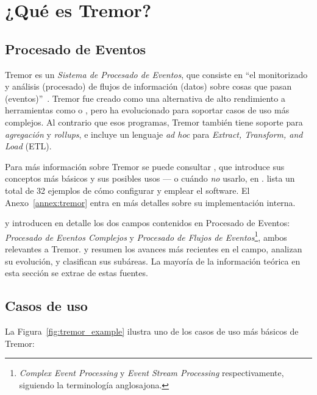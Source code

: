 
\chapter{¿Qué es Tremor?}\label{ch:tremor}

\section{Procesado de Eventos}

Tremor es un \emph{Sistema de Procesado de Eventos}, que consiste en ``el
monitorizado y análisis (procesado) de flujos de información (datos) sobre cosas
que pasan (eventos)''~\cite{luckham2011event}. Tremor fue creado como una
alternativa de alto rendimiento a herramientas como \textcite{logstash} o
\textcite{telegraf}, pero ha evolucionado para soportar casos de uso más
complejos. Al contrario que esos programas, Tremor también tiene soporte para
\emph{agregación} y \emph{rollups}, e incluye un lenguaje \emph{ad hoc} para
\emph{Extract, Transform, and Load} (ETL).

Para más información sobre Tremor se puede consultar \textcite{tremorintro}, que
introduce sus conceptos más básicos y sus posibles usos --- o cuándo \emph{no}
usarlo, en \textcite{tremorconstraints}. \textcite{tremorrecipes} lista un total
de 32 ejemplos de cómo configurar y emplear el software. El
Anexo~\ref{annex:tremor} entra en más detalles sobre su implementación interna.

\textcite{robins2010complex} y \textcite{cugola2012processing} introducen en
detalle los dos campos contenidos en Procesado de Eventos: \emph{Procesado de
Eventos Complejos} y \emph{Procesado de Flujos de
Eventos}\footnote{\emph{Complex Event Processing} y \emph{Event Stream
Processing} respectivamente, siguiendo la terminología anglosajona.}, ambos
relevantes a Tremor. \textcite{dayarathna2018recent} y
\textcite{tawsif2018review} resumen los avances más recientes en el campo,
analizan su evolución, y clasifican sus subáreas. La mayoría de la información
teórica en esta sección se extrae de estas fuentes.

\section{Casos de uso}

La Figura~\ref{fig:tremor_example} ilustra uno de los casos de uso más básicos
de Tremor:

